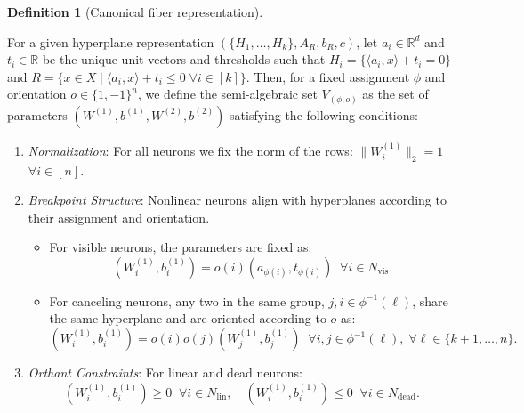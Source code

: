 \documentclass{article}
\theoremstyle{definition}
\newtheorem{definition}[theorem]{Definition}
\newcommand{\R}{\mathbb{R}}
\newcommand{\weights}[1]{W^{(#1)}}
\newcommand{\bias}[1]{b^{(#1)}}
\newcommand{\inner}[1]{\langle #1 \rangle}
\begin{document}
\begin{definition}[Canonical fiber representation]
\label{def:semi-algebraic-set-V-phi-o}

For a given hyperplane representation $(\{H_1,\ldots,H_k\}, A_R, b_R, c)$, 
let 
$a_i \in \R^d$ and $t_i \in \R$ be the unique unit vectors and thresholds such that 
$H_i = \{ \inner{a_i,x}+ t_i=0\}$ and $R = \{x \in X \mid \inner{a_i, x} + t_i \le 0 \; \forall i \in [k]\}$. 
%
Then, for a fixed assignment $\phi$ and orientation $o \in \{1, -1\}^n$, we define the semi-algebraic set $V_{(\phi, o)}$ as the set of parameters $(\weights{1}, \bias{1}, \weights{2}, \bias{2})$ satisfying the following conditions:  
%
\begin{enumerate}[leftmargin=*]
    \item \emph{Normalization}: 
    For all neurons we fix the norm of the rows: $\|\weights{1}_i\|_2 = 1$ $\forall i \in [n]$. 
    
    \item \emph{Breakpoint Structure}: 
    Nonlinear neurons align with hyperplanes according to their assignment and orientation. 
    \begin{itemize}
        \item For visible neurons, the parameters are fixed as: 
        \begin{equation} \label{eq:f_geom_vis}
            (\weights{1}_i, \bias{1}_i) = o(i) (a_{\phi(i)}, t_{\phi(i)})  \;\; \forall i \in N_{\text{vis}}.
        \end{equation}
 
        \item For canceling neurons, any two in the same group, $j,i \in \phi^{-1}(\ell)$, share the same hyperplane and are oriented according to $o$ as: 
        \begin{equation} \label{eq:f_geom_can}
            (\weights{1}_i, \bias{1}_i) = o(i) o(j) (\weights{1}_{j}, \bias{1}_{j}) \;\; \forall i,j \in \phi^{-1}(\ell) , \;  \forall \ell \in 
            \{k+1,\ldots, n\}. %
        \end{equation}
    \end{itemize}

    \item \emph{Orthant Constraints}: 
    For linear and dead neurons: 
    \begin{equation} \label{eq:f_orthant}
        (\weights{1}_i, \bias{1}_i) \ge 0 \;\; \forall i \in N_{\text{lin}}, \quad (\weights{1}_i, \bias{1}_i) \le 0 \;\; \forall i \in N_{\text{dead}}.
    \end{equation}


\end{enumerate}
\end{definition}
\end{document}
